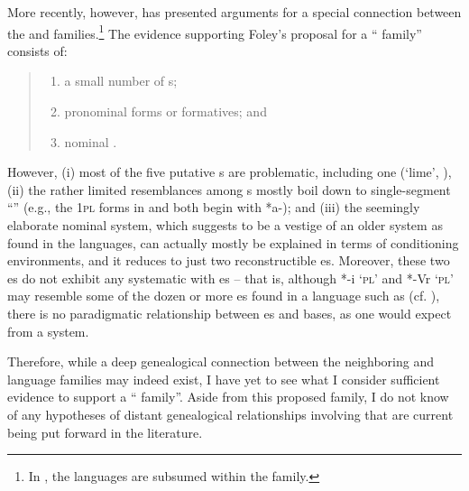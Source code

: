 More recently, however, \citet{Foley1999, Foley2000, Foley2005, Foley2018, Foley2020} has presented arguments for a special connection between the  and  families.\footnote{In  , the  languages are subsumed within the  family.} The evidence supporting Foley’s proposal for a “ family” consists of:

\begin{quote}
\begin{enumerate}[noitemsep, label={(\roman*)}, align=left, widest=190, labelsep=1ex,leftmargin=*]
\item a small number of  s;
\item {} pronominal forms or formatives; and
\item {} nominal  .
\end{enumerate}
\end{quote}

However, (i) most of the five putative  s are problematic, including one   (‘lime’, ), (ii) the rather limited resemblances among s mostly boil down to single-segment “” (e.g., the 1\textsc{pl} forms in  and  both begin with *a-); and (iii) the seemingly elaborate  nominal  system, which \citet[203--204]{Foley2018} suggests to be a vestige of an older  system as found in the  languages, can actually mostly be explained in terms of  conditioning environments, and it reduces to just two reconstructible  es. Moreover, these two es do not exhibit any systematic  with  es -- that is, although  *-i ‘\textsc{pl}’ and *-Vr ‘\textsc{pl}’ may resemble some of the dozen or more  es found in a  language such as  (cf. \citealt[167--168]{Foley1991}), there is no paradigmatic relationship between es and bases, as one would expect from a  system.


Therefore, while a deep genealogical connection between the neighboring  and  language families may indeed exist, I have yet to see what I consider sufficient evidence to support a “ family”. Aside from this proposed family, I do not know of any hypotheses of distant genealogical relationships involving  that are current being put forward in the literature.

